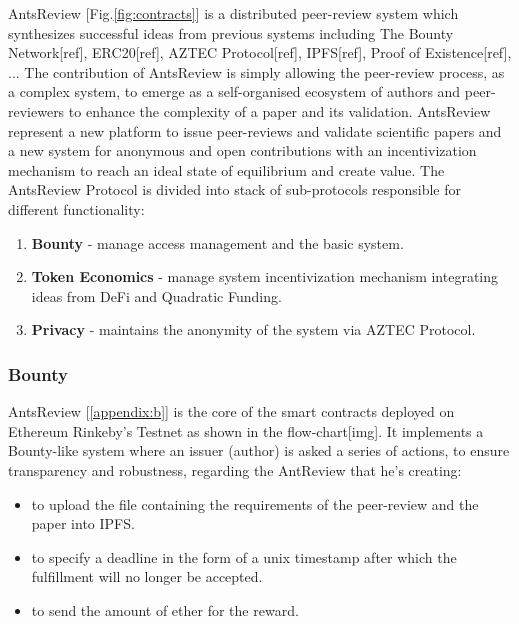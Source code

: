 \documentclass[runningheads]{llncs}
\begin{document}
AntsReview [Fig.\ref{fig:contracts}] is a distributed peer-review system which synthesizes successful ideas from previous systems including The Bounty Network[ref], ERC20[ref], AZTEC Protocol[ref], IPFS[ref], Proof of Existence[ref], ...
\newline The contribution of AntsReview is simply allowing the peer-review process, as a complex system, to emerge as a self-organised ecosystem of authors and peer-reviewers to enhance the complexity of a paper and its validation.
\newline AntsReview represent a new platform to issue peer-reviews and validate scientific papers and a new system for anonymous and open contributions with an incentivization mechanism to reach an ideal state of equilibrium and create value.
\newline The AntsReview Protocol is divided into stack of sub-protocols responsible for different functionality:

\begin{enumerate}
  \item \textbf{Bounty} - manage access management and the basic system.
  \item \textbf{Token Economics} - manage system incentivization mechanism integrating ideas from DeFi and Quadratic Funding.
  \item \textbf{Privacy} - maintains the anonymity of the system via AZTEC Protocol.
\end{enumerate}

\subsubsection{Bounty}
AntsReview [\ref{appendix:b}] is the core of the smart contracts deployed on Ethereum Rinkeby's Testnet as shown in the flow-chart[img].
\newline It implements a Bounty-like system where an issuer (author) is asked a series of actions, to ensure transparency and robustness, regarding the AntReview that he's creating:
\begin{itemize}
  \item to upload the file containing the requirements of the peer-review and the paper into IPFS.
  \item to specify a deadline in the form of a unix timestamp after which the fulfillment will no longer be accepted.
  \item to send the amount of ether for the reward.
\end{itemize}
\end{document}

